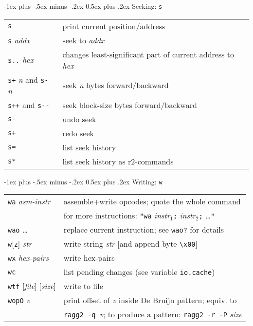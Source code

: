 \documentclass[a4paper,landscape]{article}
\makeatletter
\renewcommand{\section}{\@startsection{section}{1}{0mm}%
                                {-1ex plus -.5ex minus -.2ex}%
                                {0.5ex plus .2ex}%
                                {\normalfont\large\bfseries}}
\makeatother
\begin{document}
\begin{multicols*}{3}
\section{Seeking: \texttt{s}}
\begin{tabular}{@{}ll@{}}
\texttt{s} & print current position/address \\
\texttt{s} \textit{addx} & seek to \textit{addx} \\
\texttt{s..} \textit{hex} & changes least-significant part of current address to \textit{hex}\\
\texttt{s+} \textit{n} and \texttt{s-} \textit{n} & seek \textit{n} bytes forward/backward \\
\texttt{s++} and \texttt{s-{}-} & seek block-size bytes forward/backward \\
\texttt{s-} & undo seek \\
\texttt{s+} & redo seek \\
\texttt{s=} & list seek history \\
\texttt{s*} & list seek history as r2-commands \\
\end{tabular}

\section{Writing: \texttt{w}}
\begin{tabular}{@{}ll@{}}
\texttt{wa} \textit{asm-instr} & assemble+write opcodes;
	quote the whole command \\ &  for more instructions:
\texttt{"wa} \textit{instr$_1$}\texttt{;} \textit{instr$_2$}\texttt{;} \ldots\texttt{"} \\
\texttt{wao} \textit{\ldots} & replace current instruction; see \texttt{wao?} for details \\
\texttt{w}[\texttt{z}] \textit{str} & write string \textit{str} [and append byte \texttt{\textbackslash x00}] \\
\texttt{wx} \textit{hex-pairs} & write hex-pairs \\
\texttt{wc} & list pending changes (see variable \texttt{io.cache}) \\
\texttt{wtf} [\textit{file}] [\textit{size}] & write to file \\
\texttt{wopO} \textit{v} & print offset of \textit{v} inside De Bruijn pattern; equiv. to\\
	& \texttt{ragg2 -q }\textit{v}; to produce a pattern: \texttt{ragg2 -r -P} \textit{size} \\
\end{tabular}


\end{multicols*}
\end{document}
